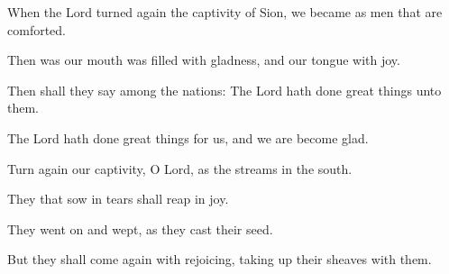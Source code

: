 When the Lord turned again the captivity of Sion, we became as men that are comforted.

Then was our mouth was filled with gladness, and our tongue with joy.

Then shall they say among the nations: The Lord hath done great things unto them.

The Lord hath done great things for us, and we are become glad.

Turn again our captivity, O Lord, as the streams in the south.

They that sow in tears shall reap in joy.

They went on and wept, as they cast their seed.

But they shall come again with rejoicing, taking up their sheaves with them.
